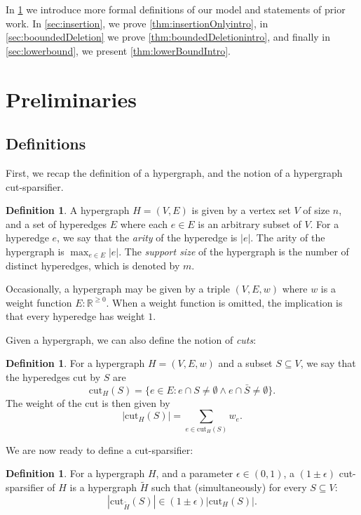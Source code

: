 \documentclass[11pt]{article}
\theoremstyle{definition}
\newtheorem{definition}[theorem]{Definition}
\newcommand{\eps}{\epsilon}
\newcommand{\cut}{\text{cut}}
\begin{document}
In \cref{sec:prelim} we introduce more formal definitions of our model and statements of prior work. In \cref{sec:insertion}, we prove \cref{thm:insertionOnlyintro}, in \cref{sec:booundedDeletion} we prove \cref{thm:boundedDeletionintro}, and finally in \cref{sec:lowerbound}, we present \cref{thm:lowerBoundIntro}.

\section{Preliminaries}\label{sec:prelim}

\subsection{Definitions}

First, we recap the definition of a hypergraph, and the notion of a hypergraph cut-sparsifier.

\begin{definition}
	A hypergraph $H = (V,E)$ is given by a vertex set $V$ of size $n$, and a set of hyperedges $E$ where each $e \in E$ is an arbitrary subset of $V$. For a hyperedge $e$, we say that the \emph{arity} of the hyperedge is $|e|$. The arity of the hypergraph is $\max_{e \in E} |e|$. The \emph{support size} of the hypergraph is the number of distinct hyperedges, which is denoted by $m$.
	
	Occasionally, a hypergraph may be given by a triple $(V, E, w)$ where $w$ is a weight function $E: \mathbb{R}^{\geq0}$. When a weight function is omitted, the implication is that every hyperedge has weight $1$. 
\end{definition}

Given a hypergraph, we can also define the notion of \emph{cuts}:

\begin{definition}
	For a hypergraph $H =  (V, E, w)$ and a subset $S \subseteq V$, we say that the hyperedges cut by $S$ are 
	\[
	\mathrm{cut}_H(S) = \{ e \in E: e \cap S \neq \emptyset \wedge 	e \cap \bar{S} \neq \emptyset\}.
	\]
	The weight of the cut is then given by 
	\[
	|\mathrm{cut}_H(S)| = \sum_{e \in \cut_H(S)} w_e. 
	\]
	\end{definition}
	
We are now ready to define a cut-sparsifier:

\begin{definition}
	For a hypergraph $H$, and a parameter $\eps \in (0,1)$, a $(1 \pm \eps)$ cut-sparsifier of $H$ is a hypergraph $\widetilde{H}$ such that (simultaneously) for every $S \subseteq V$:
	\[
		|\mathrm{cut}_{\widetilde{H}}(S)| \in (1 \pm \eps)	|\mathrm{cut}_{H}(S)|.
	\]
\end{definition}
\end{document}
